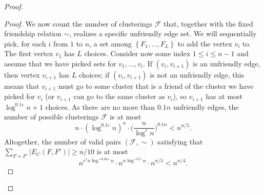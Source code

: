 \documentclass[11pt]{article}
\theoremstyle{definition}
\newcommand{\set}[1]{\left\{ #1 \right\}}
\newcommand{\fset}{{\mathcal{F}}}
\newcommand{\eps}{{\varepsilon}}
\begin{document}
\begin{titlepage}
\begin{proof}
\begin{proof}
We now count the number of clusterings $\fset$ that, together with the fixed friendship relation $\sim$, realizes a specific unfriendly edge set.
We will sequentially pick, for each $i$ from $1$ to $n$, a set among $\set{F_1,\ldots,F_L}$ to add the vertex $v_i$ to.
The first vertex $v_1$ has $L$ choices. Consider now some index $1 \le i \le n-1$ and assume that we have picked sets for $v_1,\ldots,v_{i}$. If $(v_i,v_{i+1})$ is an unfriendly edge, then vertex $v_{i+1}$ has $L$ choices; if $(v_i,v_{i+1})$ is not an unfriendly edge, this means that $v_{i+1}$ must go to some cluster that is a friend of the cluster we have picked for $v_{i}$ (or $v_{i+1}$ can go to the same cluster as $v_i$), so $v_{i+1}$ has at most $\log^{0.1\eps} n + 1$ choices.
As there are no more than $0.1n$ unfriendly edges, the number of possible clusterings $\fset$ is at most
$$
n\cdot (\log^{0.1\eps} n)^n \cdot \bigg(\frac{n}{\log^{\eps} n}\bigg)^{0.1n} < n^{n/5}.
$$
Altogether, the number of valid pairs $(\fset,\sim)$ satisfying that $\sum_{F\not\sim F'}|E_{C}(F,F')|\ge n/10$ is at most
$$
n^{c^*n \log^{-0.05\eps} n} \cdot n^{n \log^{-0.5}n} \cdot n^{n/5} < n^{n/4}.
$$
\end{proof}



\end{proof}
\end{titlepage}
\end{document}
